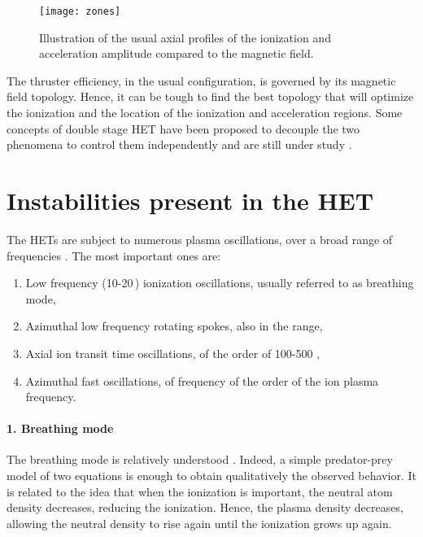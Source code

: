  \begin{figure}[hbt]
    \centering
    \texttt{[image: zones]}
    \caption{Illustration of the usual axial profiles of the ionization and acceleration amplitude compared to the magnetic field.}
    \label{fig-zones}
  \end{figure}

  The thruster efficiency, in the usual configuration, is governed by its magnetic field topology.
  Hence, it can be tough to find the best topology that will optimize the ionization and the location of the ionization and acceleration regions.
  Some concepts of double stage \ac{HET} have been proposed to decouple the two phenomena to control them independently and are still under study \citep{dubois2018}.
  

  
  \section{Instabilities present in the \acs{HET} }
  \label{sec-physics}

  The \ac{HET}s are subject to numerous plasma oscillations, over a broad range of frequencies \citep{boeuf2017,choueiri2001}.
  The most important ones are\string:
  \begin{enumerate}
    \item Low frequency (10-20\,\kilo\hertz) ionization oscillations, usually referred to as breathing mode,
    \item Azimuthal low frequency rotating spokes, also in the \kilo\hertz{} range,
    \item Axial ion transit time oscillations, of the order of 100-500 \kilo\hertz,
    \item Azimuthal fast oscillations, of frequency of the order of the ion plasma frequency.
  \end{enumerate} 

  \paragraph{1. Breathing mode\\}
  The breathing mode is relatively understood \citep{boeuf1998,barral2009,hara2014}.
  Indeed, a simple predator-prey model of two equations is enough to obtain qualitatively the observed behavior.
  It is related to the idea that when the ionization is important, the neutral atom density decreases, reducing the ionization.
  Hence, the plasma density decreases, allowing the neutral density to rise again until the ionization grows up again.
  

